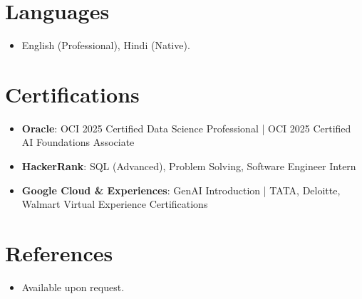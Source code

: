 \documentclass[11pt,a4paper,sans]{moderncv}
\begin{document}
\section{Languages}
\vspace{1pt}
\begin{itemize}
\item English (Professional), Hindi (Native).
\end{itemize}

\section{Certifications}
\vspace{1pt}
\begin{itemize}
\item \textbf{Oracle}: OCI 2025 Certified Data Science Professional | OCI 2025 Certified AI Foundations Associate
\item \textbf{HackerRank}: SQL (Advanced), Problem Solving, Software Engineer Intern
\item \textbf{Google Cloud \& Experiences}: GenAI Introduction | TATA, Deloitte, Walmart Virtual Experience Certifications
\end{itemize}

\section{References}
\vspace{1pt}
\begin{itemize}
\item Available upon request.
\end{itemize}
\end{document}
